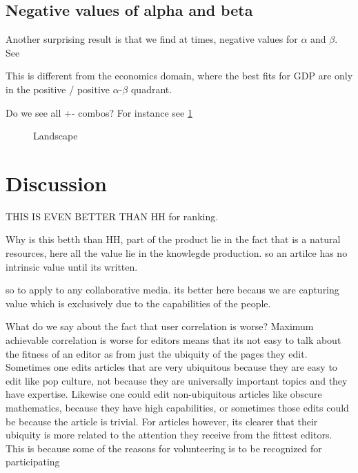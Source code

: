 \documentclass{acm_proc_article-sp}
\begin{document}
\subsection{Negative values of alpha and beta}
Another surprising result is that we find at times, negative values for $\alpha$ and $\beta$. See

This is different from the economics domain, where the best fits for GDP are only in the positive / positive $\alpha$-$\beta$ quadrant. 

Do we see all +- combos? For instance see \ref{fig:landscape}


\begin{figure}[!t]
\centering
\caption{Landscape}
\label{fig:landscape}
\end{figure}







\section{Discussion}

THIS IS EVEN BETTER THAN HH for ranking.

Why is this betth than HH, part of the product lie in the fact that is a natural resources, here all the value lie in the knowlegde production. so an artilce has no intrinsic value until its written. 

so to apply to any collaborative media. its better here becaus we are capturing value which is exclusively due to the capabilities of the people.

What do we say about the fact that user correlation is worse? 
Maximum achievable correlation is worse for editors means that its not easy to talk about the fitness of an editor as from just the ubiquity of the pages they edit. Sometimes one edits articles that are very ubiquitous because they are easy to edit like pop culture, not because they are universally important topics and they have expertise. Likewise one could edit non-ubiquitous articles like obscure mathematics, because they have high capabilities, or sometimes those edits could be because the article is trivial.  For articles however, its clearer that their ubiquity is more related to the attention they receive from the fittest editors. This is because some of the reasons for volunteering is to be recognized for participating \cite{Heather makmende}
\end{document}
